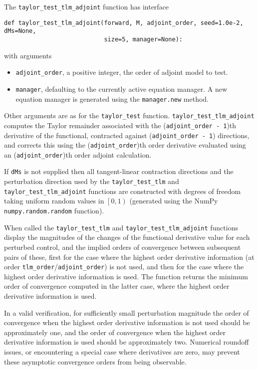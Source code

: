 \documentclass[11pt]{article}
\begin{document}
The \texttt{taylor\_test\_tlm\_adjoint} function has interface
\begin{lstlisting}
def taylor_test_tlm_adjoint(forward, M, adjoint_order, seed=1.0e-2, dMs=None,
                            size=5, manager=None):
\end{lstlisting}
with arguments
\begin{itemize}
  \item \texttt{adjoint\_order}, a positive integer, the order of adjoint model
    to test.
  \item \texttt{manager}, defaulting to the currently active equation manager.
    A new equation manager is generated using the \texttt{manager.new} method.
\end{itemize}
Other arguments are as for the \texttt{taylor\_test} function.
\texttt{taylor\_test\_tlm\_adjoint} computes the Taylor remainder associated
with the (\texttt{adjoint\_order - 1})th derivative of the functional,
contracted against (\texttt{adjoint\_order - 1}) directions, and corrects this
using the (\texttt{adjoint\_order})th order derivative evaluated using an
(\texttt{adjoint\_order})th order adjoint calculation.

If \texttt{dMs} is not supplied then all tangent-linear contraction directions
and the perturbation direction used by the \texttt{taylor\_test\_tlm} and
\texttt{taylor\_test\_tlm\_adjoint} functions are constructed with degrees of
freedom taking uniform random values in $\left[ 0, 1 \right)$ (generated using
the NumPy \texttt{numpy.random.random} function).

When called the \texttt{taylor\_test\_tlm} and
\texttt{taylor\_test\_tlm\_adjoint} functions display the magnitudes of the
changes of the functional derivative value for each perturbed control, and the
implied orders of convergence between subsequent pairs of these, first for the
case where the highest order derivative information (at order
\texttt{tlm\_order}/\texttt{adjoint\_order}) is not used, and then for the case
where the highest order derivative information is used. The function returns
the minimum order of convergence computed in the latter case, where the highest
order derivative information is used.

In a valid verification, for sufficiently small perturbation magnitude the
order of convergence when the highest order derivative information is not used
should be approximately one, and the order of convergence when the highest
order derivative information is used should be approximately two. Numerical
roundoff issues, or encountering a special case where derivatives are zero, may
prevent these asymptotic convergence orders from being observable.
\end{document}
